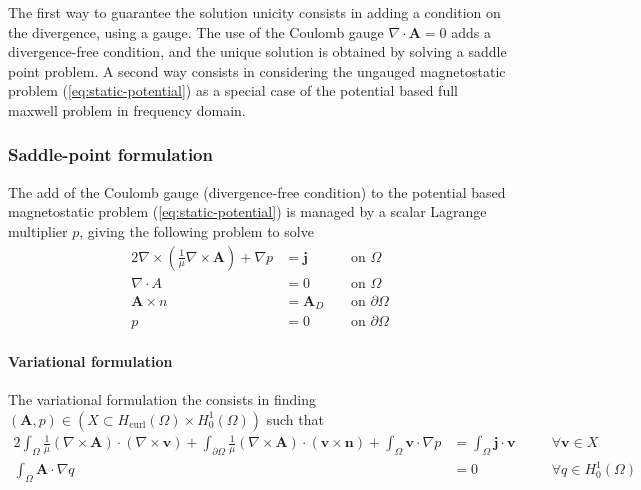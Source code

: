 \documentclass{article}
\newcommand{\bj}{\mathbf{j}}
\newcommand{\bA}{\mathbf{A}}
\newcommand{\bv}{\mathbf{v}}
\begin{document}
The first way to guarantee the solution unicity consists in adding a condition
on the divergence, using a gauge. The use of the Coulomb gauge
$\nabla\cdot\bA=0$ adds a divergence-free condition, and the unique solution is
obtained by solving a saddle point problem. A second way consists in considering
the ungauged magnetostatic problem (\ref{eq:static-potential}) as a special case
of the potential based full maxwell problem in frequency domain.

\subsubsection{Saddle-point formulation}
\label{sec:saddle-point-mawxell}
The add of the Coulomb gauge (divergence-free condition) to the potential based
magnetostatic problem (\ref{eq:static-potential}) is managed by a scalar
Lagrange multiplier $p$, giving the following problem to solve
\begin{alignat}{2}
  \nabla \times \left( \frac{1}{\mu} \nabla \times \bA \right) + \nabla p &= \bj &&\text{ on } \Omega\\
  \nabla \cdot A &= 0 &&\text{ on } \Omega \\
  \bA \times n &= \bA_D &&\text{ on } \partial \Omega \\
  p &= 0 &&\text{ on } \partial \Omega
\end{alignat}

\paragraph{Variational formulation}
The variational formulation the consists in finding
$(\bA,p)\in(X\subset H_{\mathrm{curl}}(\Omega) \times H^1_0(\Omega))$ such that
\begin{alignat}{2}
  \int_{\Omega}\frac{1}{\mu}(\nabla \times \bA) \cdot (\nabla \times \bv)
  + \int_{\partial\Omega}\frac{1}{\mu}
  (\nabla\times\bA)\cdot(\bv\times\mathbf{n})
  + \int_{\Omega} \bv \cdot \nabla p &= \int_{\Omega} \bj \cdot \bv
  &&\quad\forall \bv \in X \label{eq:vf-saddle-point-1} \\
  \int_{\Omega} \bA \cdot \nabla q &= 0
  &&\quad\forall q \in H^1_0(\Omega) \label{eq:vf-saddle-point-2}
\end{alignat}
\end{document}
